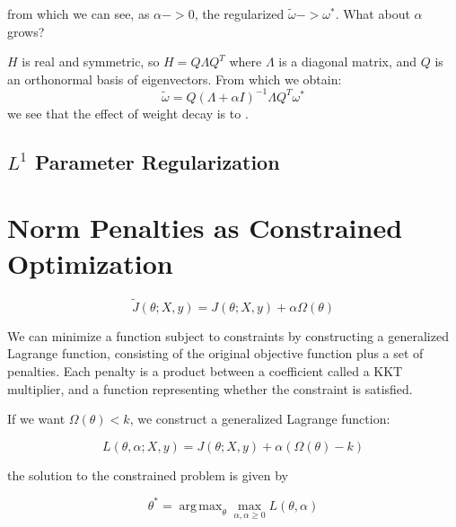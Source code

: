 \documentclass{article}
\DeclareMathOperator*{\argmax}{arg\,max}
\begin{document}
from which we can see, as $\alpha -> 0$, the regularized $\tilde{\omega} -> \omega^*$.
What about $\alpha$ grows?

$H$ is real and symmetric, so $H = Q \Lambda Q^T$ where $\Lambda$ is a diagonal matrix, and $Q$ is an orthonormal basis of eigenvectors. From which we obtain:
\begin{equation}
\tilde{\omega} = Q(\Lambda + \alpha I)^{-1} \Lambda Q^T \omega^*
\end{equation}
we see that the effect of weight decay is to {\color{red}{rescale $\omega^*$ along the axes defined by the eigenvectors of $H$}}.

\subsection{$L^1$ Parameter Regularization}

{}


\section{Norm Penalties as Constrained Optimization}

\begin{equation}
\tilde{J}(\theta; X, y) = J(\theta;X, y) + \alpha\Omega(\theta)
\end{equation}

We can minimize a function subject to constraints by constructing a generalized Lagrange function, consisting of the original objective function plus a set of penalties. Each penalty is a product between a coefficient called a KKT multiplier, and a function representing whether the constraint is satisfied.

If we want $\Omega(\theta) < k$, we construct a generalized Lagrange function:

\begin{equation}
L(\theta, \alpha; X, y) = J(\theta; X, y) + \alpha(\Omega(\theta)-k)
\end{equation}

the solution to the constrained problem is given by

\begin{equation}
\theta^* = \argmax_{\theta} \max \limits_{\alpha, \alpha \ge 0 } L(\theta, \alpha)
\end{equation}
\end{document}
